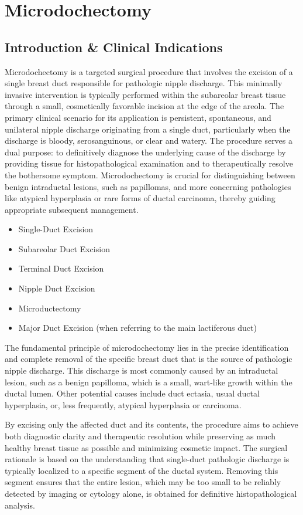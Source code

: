 \chapter{Microdochectomy}

\section*{Introduction \& Clinical Indications}
Microdochectomy is a targeted surgical procedure that involves the excision of a single breast duct responsible for pathologic nipple discharge. This minimally invasive intervention is typically performed within the subareolar breast tissue through a small, cosmetically favorable incision at the edge of the areola. The primary clinical scenario for its application is persistent, spontaneous, and unilateral nipple discharge originating from a single duct, particularly when the discharge is bloody, serosanguinous, or clear and watery. The procedure serves a dual purpose: to definitively diagnose the underlying cause of the discharge by providing tissue for histopathological examination and to therapeutically resolve the bothersome symptom. Microdochectomy is crucial for distinguishing between benign intraductal lesions, such as papillomas, and more concerning pathologies like atypical hyperplasia or rare forms of ductal carcinoma, thereby guiding appropriate subsequent management.

\begin{itemize}
  \item Single-Duct Excision
  \item Subareolar Duct Excision
  \item Terminal Duct Excision
  \item Nipple Duct Excision
  \item Microductectomy
  \item Major Duct Excision (when referring to the main lactiferous duct)
\end{itemize}

The fundamental principle of microdochectomy lies in the precise identification and complete removal of the specific breast duct that is the source of pathologic nipple discharge. This discharge is most commonly caused by an intraductal lesion, such as a benign papilloma, which is a small, wart-like growth within the ductal lumen. Other potential causes include duct ectasia, usual ductal hyperplasia, or, less frequently, atypical hyperplasia or carcinoma. 

By excising only the affected duct and its contents, the procedure aims to achieve both diagnostic clarity and therapeutic resolution while preserving as much healthy breast tissue as possible and minimizing cosmetic impact. The surgical rationale is based on the understanding that single-duct pathologic discharge is typically localized to a specific segment of the ductal system. Removing this segment ensures that the entire lesion, which may be too small to be reliably detected by imaging or cytology alone, is obtained for definitive histopathological analysis. 

